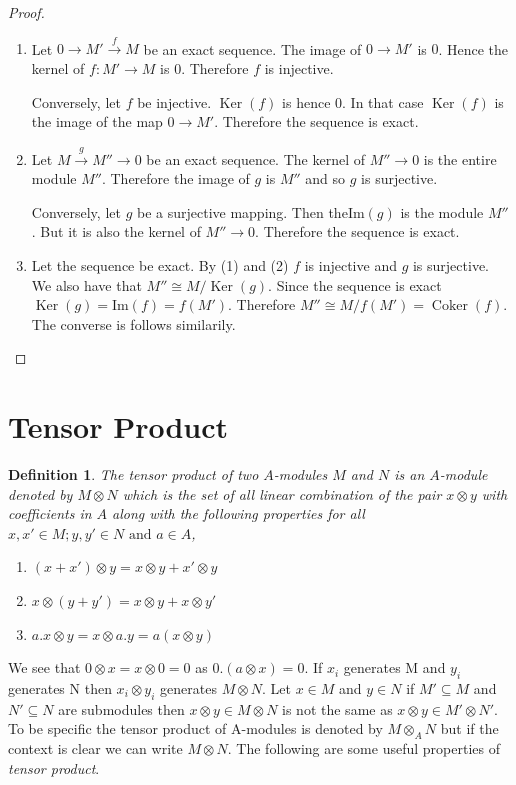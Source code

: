 \documentclass[]{report}
\newtheorem{defn}[theorem]{Definition}
\DeclareMathOperator\Ker{Ker}
\DeclareMathOperator\Coker{Coker}
\begin{document}
\begin{proof}
    \begin{enumerate}
        \item Let $0 \rightarrow M' \xrightarrow{f} M$ be an exact sequence. The image of $0 \rightarrow M'$ is $0$. Hence the kernel of $f: M' \rightarrow M$ is $0$. Therefore $f$ is injective.

            Conversely, let $f$ be injective. $\Ker(f)$ is hence $0$. In that case $\Ker(f)$ is the image of the map $0 \rightarrow M'$. Therefore the sequence is exact.
        \item Let $M \xrightarrow{g} M'' \rightarrow 0$ be an exact sequence. The kernel of $M'' \rightarrow 0$ is the entire module $M''$. Therefore the image of $g$ is $M''$ and so $g$ is surjective.

            Conversely, let $g$ be a surjective mapping. Then the$\text{Im}(g)$ is the module $M''$. But it is also the kernel of $M'' \rightarrow 0$. Therefore the sequence is exact.
        \item Let the sequence be exact. By (1) and (2) $f$ is injective and $g$ is surjective. We also have that $M'' \cong M/\Ker(g)$. Since the sequence is exact $\Ker(g) = \text{Im}(f) = f(M')$. Therefore $M'' \cong M/f(M') = \Coker(f)$. The converse is follows similarily.
    \end{enumerate}
\end{proof}

\section{Tensor Product}

\begin{defn}
    The \textit{tensor product} of two $A$-modules $M$ and $N$ is an $A$-module denoted by $M\otimes N$ which is the set of all linear combination of the pair $x \otimes y$ with coefficients in $A$ along with the following properties for all $x,x' \in M; y, y' \in N \text{ and } a \in A$,
\begin{enumerate}
    \item $(x + x') \otimes y = x \otimes y + x' \otimes y$
    \item $x \otimes (y + y') = x \otimes y + x \otimes y'$
    \item $a.x \otimes y = x \otimes a.y = a(x \otimes y)$
\end{enumerate}
\end{defn}

We see that $0 \otimes x = x\otimes 0 = 0$ as $0.(a\otimes x) = 0$. If $x_i$ generates M and $y_i$ generates N then $x_i \otimes y_i$ generates $M\otimes N$. Let $x\in M$ and $y\in N$ if $M' \subseteq M$ and $N'\subseteq N$ are submodules then $x\otimes y \in M\otimes N$ is not the same as $x\otimes y \in M'\otimes N'$. To be specific the tensor product of A-modules is denoted by $M \otimes_A N$ but if the context is clear we can write $M\otimes N$. The following are some useful properties of \textit{tensor product}.
\end{document}
